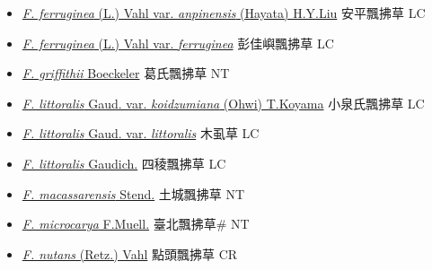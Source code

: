 \begin{itemize}
\begin{itemize}
        \item[] \href{http://www.theplantlist.org/tpl1.1/search?q=Fimbristylis+ferruginea+var.+anpinensis}{\textit{F. ferruginea} (L.) Vahl var. \textit{anpinensis} (Hayata) H.Y.Liu}   安平飄拂草 LC
        \item[] \href{http://www.theplantlist.org/tpl1.1/search?q=Fimbristylis+ferruginea+var.+ferruginea}{\textit{F. ferruginea} (L.) Vahl var. \textit{ferruginea}}   彭佳嶼飄拂草 LC
        \item[] \href{http://www.theplantlist.org/tpl1.1/search?q=Fimbristylis+griffithii}{\textit{F. griffithii} Boeckeler}   葛氏飄拂草 NT
        \item[] \href{http://www.theplantlist.org/tpl1.1/search?q=Fimbristylis+littoralis+var.+koidzumiana}{\textit{F. littoralis} Gaud. var. \textit{koidzumiana} (Ohwi) T.Koyama}   小泉氏飄拂草 LC
        \item[] \href{http://www.theplantlist.org/tpl1.1/search?q=Fimbristylis+littoralis+var.+littoralis}{\textit{F. littoralis} Gaud. var. \textit{littoralis}}   木虱草 LC
        \item[] \href{http://www.theplantlist.org/tpl1.1/search?q=Fimbristylis+littoralis}{\textit{F. littoralis} Gaudich.}   四稜飄拂草 LC
        \item[] \href{http://www.theplantlist.org/tpl1.1/search?q=Fimbristylis+macassarensis}{\textit{F. macassarensis} Stend.}   土城飄拂草 NT
        \item[] \href{http://www.theplantlist.org/tpl1.1/search?q=Fimbristylis+microcarya}{\textit{F. microcarya} F.Muell.}   臺北飄拂草\# NT
        \item[] \href{http://www.theplantlist.org/tpl1.1/search?q=Fimbristylis+nutans}{\textit{F. nutans} (Retz.) Vahl}   點頭飄拂草 CR

\end{itemize}
\end{itemize}
